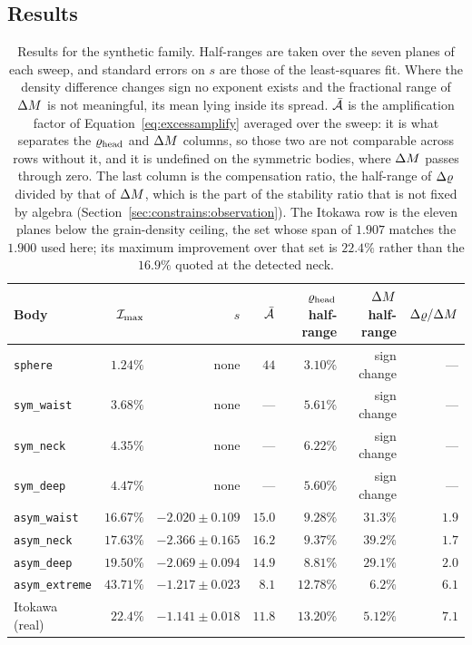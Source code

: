 \subsection{Results}
\label{app:synth:results}

\begin{table}[htbp]
\centering
\small
\caption{Results for the synthetic family. Half-ranges are taken over the seven
planes of each sweep, and standard errors on $s$ are those of the
least-squares fit. Where the density difference changes sign no exponent
exists and the fractional range of $\Delta M$ is not meaningful, its mean lying
inside its spread. $\bar{\mathcal{A}}$ is the amplification factor of
Equation~\eqref{eq:excessamplify} averaged over the sweep: it is what
separates the $\varrho_{\mathrm{head}}$ and $\Delta M$ columns, so those two are not
comparable across rows without it, and it is undefined on the symmetric
bodies, where $\Delta M$ passes through zero. The last column is the
compensation ratio, the half-range of $\Delta\varrho$ divided by that of $\Delta M$,
which is the part of the stability ratio that is not fixed by algebra
(Section~\ref{sec:constrains:observation}). The Itokawa row is the eleven
planes below the grain-density ceiling, the set whose span of $1.907$ matches
the $1.900$ used here; its maximum improvement over that set is $22.4\%$
rather than the $16.9\%$ quoted at the detected neck.}
\label{tab:appsynthres}
\begin{tabular}{lrrrrrr}
\toprule
Body & $\mathcal{I}_{\max}$ & $s$ & $\bar{\mathcal{A}}$ & $\varrho_{\mathrm{head}}$ half-range
 & $\Delta M$ half-range & $\Delta\varrho/\Delta M$ \\
\midrule
\texttt{sphere}       & $1.24\%$  & none & $44$ & $3.10\%$  & sign change & --- \\
\texttt{sym\_waist}   & $3.68\%$  & none & ---  & $5.61\%$  & sign change & --- \\
\texttt{sym\_neck}    & $4.35\%$  & none & ---  & $6.22\%$  & sign change & --- \\
\texttt{sym\_deep}    & $4.47\%$  & none & ---  & $5.60\%$  & sign change & --- \\
\addlinespace
\texttt{asym\_waist}  & $16.67\%$ & $-2.020\pm0.109$ & $15.0$ & $9.28\%$  & $31.3\%$ & $1.9$ \\
\texttt{asym\_neck}   & $17.63\%$ & $-2.366\pm0.165$ & $16.2$ & $9.37\%$  & $39.2\%$ & $1.7$ \\
\texttt{asym\_deep}   & $19.50\%$ & $-2.069\pm0.094$ & $14.9$ & $8.81\%$  & $29.1\%$ & $2.0$ \\
\addlinespace
\texttt{asym\_extreme}& $43.71\%$ & $-1.217\pm0.023$ & $8.1$  & $12.78\%$ & $6.2\%$  & $6.1$ \\
\midrule
Itokawa (real)        & $22.4\%$  & $-1.141\pm0.018$ & $11.8$ & $13.20\%$ & $5.12\%$ & $7.1$ \\
\bottomrule
\end{tabular}
\end{table}

